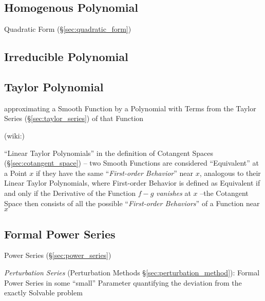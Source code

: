 \subsection{Homogenous Polynomial}\label{sec:homogenous_polynomial}

Quadratic Form (\S\ref{sec:quadratic_form})



\subsection{Irreducible Polynomial}\label{sec:irreducible_polynomial}

\subsection{Taylor Polynomial}\label{sec:taylor_polynomial}

approximating a Smooth Function by a Polynomial with Terms from the
Taylor Series (\S\ref{sec:taylor_series}) of that Function

(wiki:)

``Linear Taylor Polynomials'' in the definition of Cotangent Spaces
(\S\ref{sec:cotangent_space}) -- two Smooth Functions are considered
``Equivalent'' at a Point $x$ if they have the same ``\emph{First-order
  Behavior}'' near $x$, analogous to their Linear Taylor Polynomials,
where First-order Behavior is defined as Equivalent if and only if the
Derivative of the Function $f-g$ \emph{vanishes} at $x$ --the Cotangent Space
then consists of all the possible ``\emph{First-order Behaviors}'' of a
Function near $x$



\subsection{Formal Power Series}\label{sec:formal_power_series}

\fist Power Series (\S\ref{sec:power_series})

\fist \emph{Perturbation Series} (Perturbation Methods
\S\ref{sec:perturbation_method}): Formal Power Series in some ``small''
Parameter quantifying the deviation from the exactly Solvable problem



